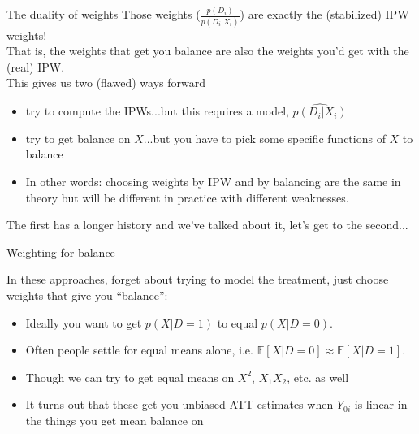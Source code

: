 \documentclass[xcolor=dvipsnames]{beamer}
\newcommand\E{\mathbb{E}}
\begin{document}
\begin{frame}{The duality of weights}
\small
{} Those weights ($\frac{p(D_i)}{p(D_i|X_i)}$) are exactly the (stabilized) IPW weights! \\
\bigskip
{} That is, the weights that get you balance are also the weights you'd get with the (real) IPW. \\
\bigskip
{} This gives us two (flawed) ways forward
\footnotesize
\begin{itemize}
\item try to compute the IPWs...but this requires a model, $\widehat{p(D_i|X_i)}$
\medskip
\item try to get balance on $X$...but you have to pick some specific functions of $X$ to balance
\medskip
\item In other words: choosing weights by IPW and by balancing are the same in theory but will be different in practice with different weaknesses.
\end{itemize}
\normalsize 
\small
\bigskip
{} The first has a longer history and we've talked about it, let's get to the second...\\
\end{frame}



\begin{frame}{Weighting for balance}

 In these approaches, forget about trying to model the treatment, just choose weights that give you ``balance'':\\

\small
\begin{itemize}
\item<3-> Ideally you want to get $p(X|D=1)$ to equal $p(X|D=0)$. 
\smallskip
\item<4-> Often people settle for equal means alone, i.e. $\E[X|D=0] \approx \E[X|D=1]$.
\smallskip
\item<5-> Though we can try to get equal means on $X^2$, $X_1 X_2$, etc. as well
\smallskip
\item<6-> It turns out that these get you unbiased ATT estimates when $Y_{0i}$ is linear in the things you get mean balance on
\end{itemize}
\end{frame}
\end{document}
